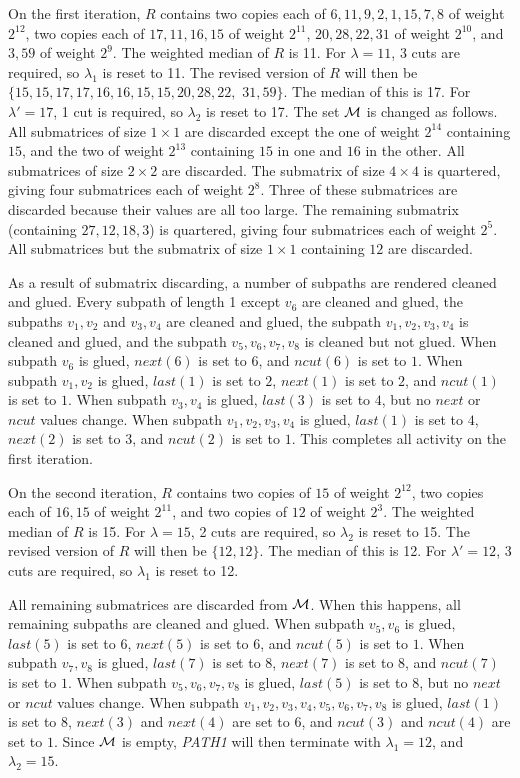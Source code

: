 {{{On the first iteration,
$R$ contains two copies each of
$6,11,9,2,1,15,7,8$ of weight $2^{12}$,
two copies each of $17,11,16,15$ of weight $2^{11}$,
$20,28,22,31$ of weight $2^{10}$,
and $3,59$ of weight $2^{9}$.
The weighted median of $R$ is 11.
For $\lambda = 11$, 3 cuts are required,
so $\lambda_1$ is reset to 11.
The revised version of $R$ will then be
$\{15,15,17,17,16,16,15,15,20,28,22,$ $31,59\}$.
The median of this is 17.
For $\lambda '= 17$, 1 cut is required,
so $\lambda_2$ is reset to 17.
The set $\cal M$ is changed as follows.
All submatrices of size $1 \times 1$ are discarded
except the one of weight $2^{14}$ containing $15$,
and the two of weight $2^{13}$ containing $15$ in one and $16$ in the other.
All submatrices of size $2 \times 2$ are discarded.
The submatrix of size $4 \times 4$ is quartered,
giving four submatrices each of weight $2^8$.
Three of these submatrices are discarded because their values are all too large.
The remaining submatrix (containing $27,12,18,3$) is quartered,
giving four submatrices each of weight $2^5$.
All submatrices but the submatrix of size $1 \times 1$ containing $12$
are discarded.

As a result of submatrix discarding,
a number of subpaths are rendered cleaned and glued.
Every subpath of length 1 except $v_6$ are cleaned and glued,
the subpaths $v_1,v_2$ and $v_3,v_4$ are cleaned and glued,
the subpath $v_1,v_2,v_3,v_4$ is cleaned and glued,
and the subpath $v_5,v_6,v_7,v_8$ is cleaned but not glued.
When subpath $v_6$ is glued,
$next(6)$ is set to $6$,
and $ncut(6)$ is set to $1$.
When subpath $v_1,v_2$ is glued,
$last(1)$ is set to $2$,
$next(1)$ is set to $2$,
and $ncut(1)$ is set to $1$.
When subpath $v_3,v_4$ is glued,
$last(3)$ is set to $4$,
but no $next$ or $ncut$ values change.
When subpath $v_1,v_2,v_3,v_4$ is glued,
$last(1)$ is set to $4$,
$next(2)$ is set to $3$,
and $ncut(2)$ is set to $1$.
This completes all activity on the first iteration.

On the second iteration,
$R$ contains two copies of
$15$ of weight $2^{12}$,
two copies each of $16,15$ of weight $2^{11}$,
and two copies of $12$ of weight $2^{3}$.
The weighted median of $R$ is 15.
For $\lambda = 15$, 2 cuts are required,
so $\lambda_2$ is reset to 15.
The revised version of $R$ will then be
$\{12,12\}$.
The median of this is 12.
For $\lambda '= 12$, 3 cuts are required,
so $\lambda_1$ is reset to 12.

All remaining submatrices are discarded from $\cal M$.
When this happens,
all remaining subpaths are cleaned and glued.
When subpath $v_5,v_6$ is glued,
$last(5)$ is set to $6$,
$next(5)$ is set to $6$,
and $ncut(5)$ is set to $1$.
When subpath $v_7,v_8$ is glued,
$last(7)$ is set to $8$,
$next(7)$ is set to $8$,
and $ncut(7)$ is set to $1$.
When subpath $v_5,v_6,v_7,v_8$ is glued,
$last(5)$ is set to $8$,
but no $next$ or $ncut$ values change.
When subpath $v_1,v_2,v_3,v_4,v_5,v_6,v_7,v_8$ is glued,
$last(1)$ is set to $8$,
$next(3)$ and $next(4)$ are set to $6$,
and $ncut(3)$ and $ncut(4)$ are set to $1$.
Since $\cal M$ is empty,
{\it PATH1} will then terminate with $\lambda_1 = 12$,
and $\lambda_2 = 15$.

}}}
